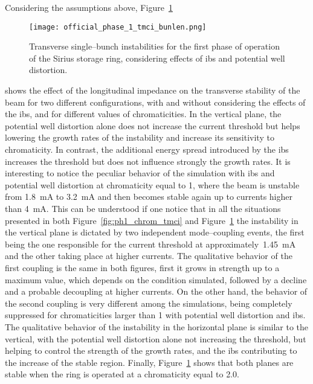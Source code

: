     Considering the assumptions above, Figure~\ref{fig:ph1_chrom_tmci_bunlen}
    \begin{figure}
        \centering
        \texttt{[image: official\_phase\_1\_tmci\_bunlen.png]}
        \caption{Transverse single--bunch instabilities for the first phase of operation of the Sirius storage ring, considering effects of \gls{ibs} and potential well distortion.}
        \label{fig:ph1_chrom_tmci_bunlen}
    \end{figure}
    shows the effect of the longitudinal impedance on the transverse stability of the beam for two different configurations, with and without considering the effects of the \gls{ibs}, and for different values of chromaticities. In the vertical plane, the potential well distortion alone does not increase the current threshold but helps lowering the growth rates of the instability and increase its sensitivity to chromaticity. In contrast, the additional energy spread introduced by the \gls{ibs} increases the threshold but does not influence strongly the growth rates. It is interesting to notice the peculiar behavior of the simulation with \gls{ibs} and potential well distortion at chromaticity equal to \num{1}, where the beam is unstable from \SI{1.8}{\milli\ampere} to \SI{3.2}{\milli\ampere} and then becomes stable again up to currents higher than \SI{4}{\milli\ampere}.
    This can be understood if one notice that in all the situations presented in both Figure~\ref{fig:ph1_chrom_tmci} and Figure~\ref{fig:ph1_chrom_tmci_bunlen} the instability in the vertical plane is dictated by two independent mode--coupling events, the first being the one responsible for the current threshold at approximately~\SI{1.45}{\milli\ampere} and the other taking place at higher currents. The qualitative behavior of the first coupling is the same in both figures, first it grows in strength up to a maximum value, which depends on the condition simulated, followed by a decline and a probable decoupling at higher currents. On the other hand, the behavior of the second coupling is very different among the simulations, being completely suppressed for chromaticities larger than \num{1} with potential well distortion and \gls{ibs}. The qualitative behavior of the instability in the horizontal plane is similar to the vertical, with the potential well distortion alone not increasing the threshold, but helping to control the strength of the growth rates, and the \gls{ibs} contributing to the increase of the stable region.
    Finally, Figure~\ref{fig:ph1_chrom_tmci_bunlen} shows that both planes are stable when the ring is operated at a chromaticity equal to \num{2.0}.


